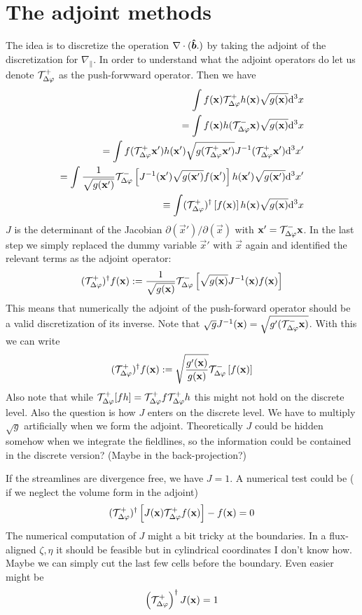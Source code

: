 \section{The adjoint methods}
The idea is to discretize the operation $\nabla\cdot( \bm{\hat{b}} .)$ by
taking the adjoint of the discretization for $\nabla_\parallel$. 
In order to understand what the adjoint operators do let us denote $\mathcal T^+_{\Delta\varphi}$ as the push-forwward operator. Then we have
\begin{align}
    \int f({\mathbf{x}}) \mathcal T^+_{\Delta\varphi} h({\mathbf{x}}) \sqrt{g({\mathbf{x}})}\mathrm{d}^3x \\
    =  \int f({\mathbf{x}}) h(\mathcal T^-_{\Delta\varphi} {\mathbf{x}})\sqrt{g({\mathbf{x}})}\mathrm{d}^3x \\
    =  \int f(\mathcal T^+_{\Delta\varphi} {\mathbf{x}}') h({\mathbf{x}}')\sqrt{g(\mathcal T^+_{\Delta\varphi} {\mathbf{x}}')}J^{-1}( \mathcal T^+_{\Delta\varphi}{\mathbf{x}}') \mathrm{d}^3x' \\
    =  \int \frac{1}{\sqrt{g({\mathbf{x}}')}}\mathcal T^-_{\Delta\varphi}\left[J^{-1}({\mathbf{x}}')\sqrt{g({\mathbf{x}}')}f({\mathbf{x}}')\right] h({\mathbf{x}}')\sqrt{g({\mathbf{x}}')}   \mathrm{d}^3x' \\
    \equiv  \int (\mathcal T^+_{\Delta\varphi})^\dagger\left[f({\mathbf{x}})\right] h({\mathbf{x}})\sqrt{g({\mathbf{x}})}   \mathrm{d}^3x
    \label{}
\end{align}
$J$ is the determinant of the Jacobian $\partial(\vec x')/\partial(\vec x)$ with ${\mathbf{x}}' = \mathcal T^-_{\Delta\varphi} {\mathbf{x}}$.
In the last step we simply replaced the dummy variable $\vec x'$ with $\vec x$ again and identified the relevant terms
as the adjoint operator:
\begin{align}
    (\mathcal T^+_{\Delta\varphi})^\dagger f({\mathbf{x}} ) := \frac{1}{\sqrt{g({\mathbf{x}})}} \mathcal T^-_{\Delta\varphi}\left[\sqrt{g({\mathbf{x}})} J^{-1}({\mathbf{x}}) f({\mathbf{x}}) \right]
    \label{}
\end{align}
This means that numerically the adjoint of the push-forward 
operator should be a valid discretization of its inverse.
Note that $\sqrt{g}J^{-1}({\mathbf{x}}) = \sqrt{g'(\mathcal T^-_{\Delta\varphi} {\mathbf{x}})}$.
With this we can write
\begin{align}
    (\mathcal T^+_{\Delta\varphi})^\dagger f({\mathbf{x}} ) := \sqrt{\frac{g'({\mathbf{x}})}{g({\mathbf{x}})}} \mathcal T^-_{\Delta\varphi}\left[f({\mathbf{x}}) \right]
    \label{}
\end{align}
Also note that while $\mathcal T^+_{\Delta\varphi} [fh] = \mathcal T^+_{\Delta\varphi} f \mathcal T^+_{\Delta\varphi} h$ this might not 
hold on the discrete level. Also the question is how $J$ enters 
on the discrete level. We have to multiply $\sqrt{g}$ artificially when we form the adjoint. 
Theoretically $J$ could be hidden somehow when we integrate the fieldlines, so the information could be contained in the discrete version? (Maybe in the back-projection?)

If the streamlines are divergence free, we have $J=1$.
A numerical test could be ( if we neglect the volume form in the adjoint)
\begin{align}
    (\mathcal T^+_{\Delta\varphi})^\dagger \left[J({\mathbf{x}})\mathcal T^+_{\Delta\varphi} f({\mathbf{x}})\right] - f({\mathbf{x}}) = 0
    \label{}
\end{align}
The numerical computation of $J$ might a bit tricky at the boundaries. 
In a flux-aligned $\zeta, \eta$ it should be feasible but in cylindrical coordinates I don't know how. Maybe we can simply cut the last few cells before the boundary.
Even easier might be
\begin{align}
    \left(\mathcal T^+_{\Delta\varphi}\right)^\dagger J({\mathbf{x}} ) = 1
    \label{}
\end{align}

